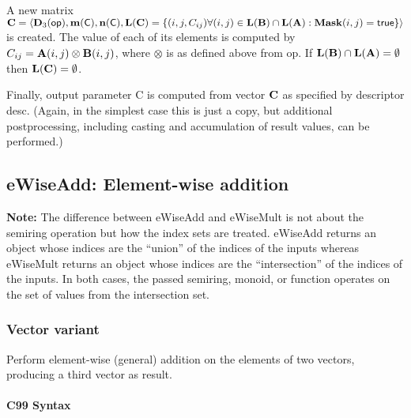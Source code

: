 A new matrix ${\bf C} = \langle \bold{D}_3({\sf op}), \bold{m}({\bf \sf C}),
\bold{n}({\bf \sf C}), \bold{L}({\bf C}) = \{(i,j,C_{ij})  \forall (i,j) \in
\bold{L}({\bf B}) \cap \bold{L}({\bf A}) : {\bf Mask}(i,j)
= {\sf true} \} \rangle$ is created.  The value of each of its
elements is computed by $C_{ij} = {\bf A}(i,j) \otimes {\bf B}(i,j)$,
where $\otimes$ is as defined above from {\sf op}.
If $\bold{L}({\bf B}) \cap \bold{L}({\bf A}) = \emptyset$
then $\bold{L}({\bf C}) = \emptyset$.

Finally, output parameter {\sf C} is computed from vector ${\bf C}$
as specified by descriptor {\sf desc}. (Again, in the simplest case this
is just a copy, but additional postprocessing, including casting and
accumulation of result values, can be performed.) 



\subsection{{\sf eWiseAdd}: Element-wise addition}

{\bf Note:} The difference between {\sf eWiseAdd} and {\sf eWiseMult} is not about the semiring operation but how the index sets are treated.
 {\sf eWiseAdd} returns an object whose indices are the ``union'' of the indices of the inputs whereas  
 {\sf eWiseMult} returns an object whose indices are the ``intersection'' of the indices of the inputs. In both cases, the passed semiring, monoid, or function operates on the 
 set of values from the intersection set. 

\subsubsection{Vector variant}

Perform element-wise (general) addition on the elements of two vectors,
producing a third vector as result.

\paragraph{C99 Syntax}

